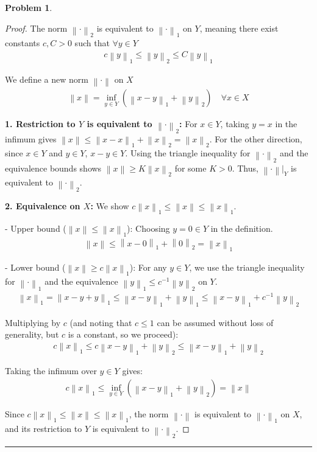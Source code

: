 \documentclass{article}
\newcommand{\norm}[1]{\left\|#1\right\|}
\newtheorem{problem}{Problem}
\begin{document}
\begin{problem}
\end{problem}
\begin{proof}
    The norm $\norm{\cdot}_2$ is equivalent to $\norm{\cdot}_1$ on $Y$, meaning there exist constants $c, C > 0$ such that $\forall y \in Y$
    \begin{align}
    c \norm{y}_1 \leq \norm{y}_2 \leq C \norm{y}_1
    \end{align}

    We define a new norm $\norm{\cdot}$ on $X$
    \begin{align}
    \norm{x} = \inf_{y \in Y} \left( \norm{x-y}_1 + \norm{y}_2 \right) \quad \forall x \in X
    \end{align}

    \textbf{1. Restriction to $Y$ is equivalent to $\norm{\cdot}_2$:}
    For $x \in Y$, taking $y=x$ in the infimum gives $\norm{x} \le \norm{x-x}_1 + \norm{x}_2 = \norm{x}_2$.
    For the other direction, since $x \in Y$ and $y \in Y$, $x-y \in Y$. Using the triangle inequality for $\norm{\cdot}_2$ and the equivalence bounds shows $\norm{x} \ge K \norm{x}_2$ for some $K>0$. Thus, $\norm{\cdot}|_Y$ is equivalent to $\norm{\cdot}_2$.

    \textbf{2. Equivalence on $X$:}
    We show $c \norm{x}_1 \le \norm{x} \le \norm{x}_1$.

    - Upper bound ($\norm{x} \le \norm{x}_1$):
    Choosing $y=0 \in Y$ in the definition.
    \begin{align}
        \norm{x} \le \norm{x-0}_1 + \norm{0}_2 = \norm{x}_1
    \end{align}

    - Lower bound ($\norm{x} \ge c \norm{x}_1$):
    For any $y \in Y$, we use the triangle inequality for $\norm{\cdot}_1$ and the equivalence $\norm{y}_1 \le c^{-1} \norm{y}_2$ on $Y$.
    \begin{align}
        \norm{x}_1 = \norm{x-y+y}_1 \le \norm{x-y}_1 + \norm{y}_1 \le \norm{x-y}_1 + c^{-1} \norm{y}_2
    \end{align}

    Multiplying by $c$ (and noting that $c \le 1$ can be assumed without loss of generality, but $c$ is a constant, so we proceed):
    \begin{align}
    c \norm{x}_1 \le c \norm{x-y}_1 + \norm{y}_2 \le \norm{x-y}_1 + \norm{y}_2
    \end{align}

    Taking the infimum over $y \in Y$ gives:
    \begin{align}
    c \norm{x}_1 \le \inf_{y \in Y} \left( \norm{x-y}_1 + \norm{y}_2 \right) = \norm{x}
    \end{align}
    
    Since $c \norm{x}_1 \le \norm{x} \le \norm{x}_1$, the norm $\norm{\cdot}$ is equivalent to $\norm{\cdot}_1$ on $X$, and its restriction to $Y$ is equivalent to $\norm{\cdot}_2$.
\end{proof}


\hrule
\vspace{0.5em}
\end{document}
